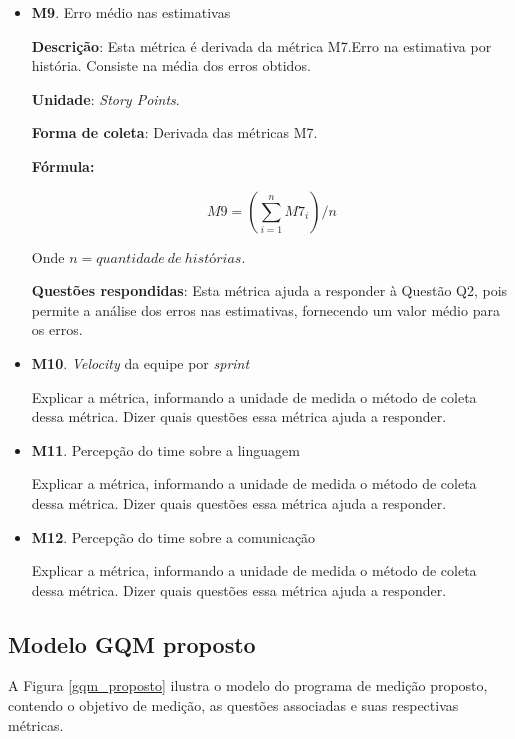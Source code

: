 \begin{itemize}
	 \item \textbf{M9}. Erro médio nas estimativas

	   \subitem \textbf{Descrição}: Esta métrica é derivada da métrica M7.Erro na estimativa por história.
		    Consiste na média dos erros obtidos.

	   \subitem \textbf{Unidade}: \textit{Story Points}.

	   \subitem \textbf{Forma de coleta}: Derivada das métricas M7.

	      \subsubitem \textbf{Fórmula:}

		$$ M9 = (\sum\limits_{i=1}^{n}M7_i)/n $$

	      \subsubitem Onde $n = quantidade\ de\ histórias$.

	   \subitem \textbf{Questões respondidas}: Esta métrica ajuda a responder à Questão Q2, pois permite a análise
		    dos erros nas estimativas, fornecendo um valor médio para os erros.

	 \item \textbf{M10}. \textit{Velocity} da equipe por \textit{sprint}

	   \subitem Explicar a métrica, informando a unidade de medida o método de coleta dessa métrica. Dizer quais questões essa
		    métrica ajuda a responder.

	 \item \textbf{M11}. Percepção do time sobre a linguagem

	   \subitem Explicar a métrica, informando a unidade de medida o método de coleta dessa métrica. Dizer quais questões essa
		    métrica ajuda a responder.

	 \item \textbf{M12}. Percepção do time sobre a comunicação

	   \subitem Explicar a métrica, informando a unidade de medida o método de coleta dessa métrica. Dizer quais questões essa
		    métrica ajuda a responder.

	\end{itemize}

      \vfill
      \pagebreak
      \subsection{Modelo GQM proposto}

	A Figura \ref{gqm_proposto} ilustra o modelo do programa de medição proposto, contendo o objetivo de medição, as
	questões associadas e suas respectivas métricas.

